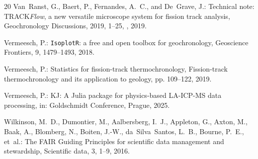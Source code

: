 \documentclass[gchron, manuscript]{copernicus}
\begin{document}
\begin{thebibliography}{20}
Van~Ranst, G., Baert, P., Fernandes, A.~C., and De~Grave, J.: Technical note:
  TRACK\textit{Flow}, a new versatile microscope system for fission track
  analysis, Geochronology Discussions, 2019, 1--25,
  , 2019.

Vermeesch, P.: {\texttt{IsoplotR}: a free and open toolbox for geochronology},
  Geoscience Frontiers, 9, 1479--1493, 2018.

Vermeesch, P.: Statistics for fission-track thermochronology, Fission-track
  thermochronology and its application to geology, pp. 109--122, 2019.

Vermeesch, P.: {KJ: A Julia package for physics-based LA-ICP-MS data
  processing}, in: Goldschmidt Conference, Prague, 2025.

Wilkinson, M.~D., Dumontier, M., Aalbersberg, I.~J., Appleton, G., Axton, M.,
  Baak, A., Blomberg, N., Boiten, J.-W., da~Silva~Santos, L.~B., Bourne, P.~E.,
  et~al.: {The FAIR Guiding Principles for scientific data management and
  stewardship}, Scientific data, 3, 1--9, 2016.

\end{thebibliography}

%
\end{document}
